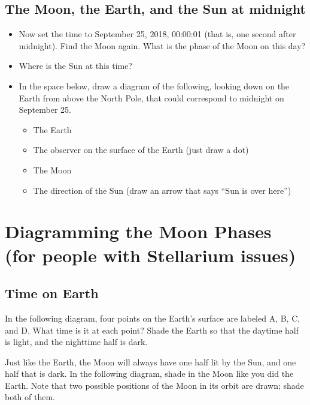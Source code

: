 \documentclass[11pt]{article}
\begin{document}
\subsection{The Moon, the Earth, and the Sun at midnight}

\begin{itemize}

\item Now set the time to September 25, 2018, 00:00:01 (that is, one second after midnight). Find the Moon again. What is
the phase of the Moon on this day?

\vspace{1in}

\item Where is the Sun at this time?

\vspace{1in}

\item In the space below, draw a diagram of the following, looking down on the Earth from above the North Pole, that 
could correspond to midnight on September 25. 

\begin{itemize}
\item The Earth
\item The observer on the surface of the Earth (just draw a dot)
\item The Moon
\item The direction of the Sun (draw an arrow that says ``Sun is over here'')
\end{itemize}
\end{itemize}

\newpage

\section{Diagramming the Moon Phases (for people with Stellarium issues)}

\subsection{Time on Earth}

In the following diagram, four points on the Earth's surface are labeled A, B, C, and D. What time is it at each point?
Shade the Earth so that the daytime half is light, and the nighttime half is dark.

\vspace{3in}

Just like the Earth, the Moon will always have one half lit by the Sun, and one half that is dark. In the following diagram,
shade in the Moon like you did the Earth. Note that two possible positions of the Moon in its orbit are drawn; shade both of them.
\end{document}
